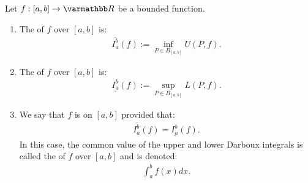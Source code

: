     \begin{definition}
        Let $f:[a,b] \rightarrow \bfR$ be a bounded function.
            \begin{enumerate}[label = (\arabic*),itemsep=1pt,topsep=3pt]
                \item The  of $f$ over $[a,b]$ is:
                    \begin{equation*}
                    \begin{split}
                        \overline{I_{a}^{b}}(f) :=\inf_{P \in B_{[a,b]}}U(P,f).
                    \end{split}
                    \end{equation*}
                \item The  of $f$ over $[a,b]$ is:
                \begin{equation*}
                \begin{split}
                    \underline{I_{a}^{b}}(f) :=\sup_{P \in B_{[a,b]}}L(P,f).
                    \end{split}
                    \end{equation*}

                \item We say that $f$ is  on $[a,b]$ provided that:
                    \begin{equation*}
                    \begin{split}
                        \overline{I_{a}^{b}}(f) = \underline{I_{a}^{b}}(f) .
                    \end{split}
                    \end{equation*}
                In this case, the common value of the upper and lower Darboux integrals is called the  of $f$ over $[a,b]$ and is denoted:
                    \begin{equation*}
                    \begin{split}
                        \int_a^b f(x) dx.
                    \end{split}
                    \end{equation*}
            \end{enumerate}
    \end{definition}

